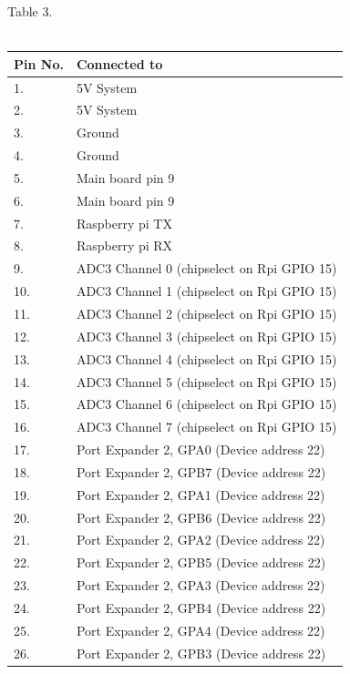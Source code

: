\documentclass[a4paper,12pt,oneside]{book}
\begin{document}
\pagebreak
\hspace{3cm}Table 3.\\\\
\begin{tabular}{|p{2cm}|p{10cm}|}
	\hline
	\textbf{Pin No.} & \textbf{Connected to} \\ [0.5ex]
	\hline 
	1. & 5V System\\
	\hline
		2. & 5V System\\
	\hline
		3. & Ground\\
	\hline  
        4. & Ground\\
    \hline	
    	5. &Main board pin 9\\
	\hline
		6. & Main board pin 9\\
	\hline
		7. & Raspberry pi TX\\
	\hline
		8. &  Raspberry pi RX\\
	\hline
	9. &ADC3 Channel 0 (chipselect on Rpi GPIO 15)\\
\hline
	10. &ADC3 Channel 1 (chipselect on Rpi GPIO 15)\\
\hline
	11. &ADC3 Channel 2 (chipselect on Rpi GPIO 15)\\
\hline
	12. &ADC3 Channel 3 (chipselect on Rpi GPIO 15)\\
\hline
	13. &ADC3 Channel 4 (chipselect on Rpi GPIO 15)\\
\hline
	14. &ADC3 Channel 5 (chipselect on Rpi GPIO 15)\\
\hline
	15. &ADC3 Channel 6 (chipselect on Rpi GPIO 15)\\
\hline
    16. &ADC3 Channel 7 (chipselect on Rpi GPIO 15)\\
\hline
 17. &Port Expander 2, GPA0 (Device address 22)\\
\hline
 18. &Port Expander 2, GPB7 (Device address 22)\\
\hline
 19. &Port Expander 2, GPA1 (Device address 22)\\
\hline
 20. &Port Expander 2, GPB6 (Device address 22)\\
\hline
 21. &Port Expander 2, GPA2 (Device address 22)\\
\hline
 22. &Port Expander 2, GPB5 (Device address 22)\\
\hline
 23. &Port Expander 2, GPA3 (Device address 22)\\
\hline
 24. &Port Expander 2, GPB4 (Device address 22)\\
\hline
 25. &Port Expander 2, GPA4 (Device address 22)\\
\hline
 26. &Port Expander 2, GPB3 (Device address 22)\\

\end{tabular}
\end{document}

